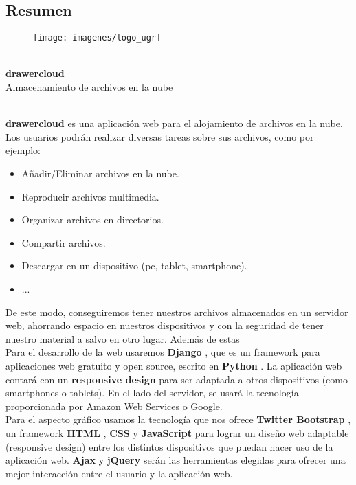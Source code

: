 \subsection{Resumen}
\hfill
\begin{figure}[h]
	\centering
	\texttt{[image: imagenes/logo\_ugr]}
\end{figure}
\hfill
\begin{center}
	\horrule{0.5pt} \\[0.4cm] %
	\huge \textbf{drawercloud} \\ %
	\Large Almacenamiento de archivos en la nube \\ %
	\horrule{2pt} \\[0.5cm] %
\end{center}

\hfill

\textbf{drawercloud} es una aplicación web para el alojamiento de archivos en la nube. Los usuarios podrán realizar diversas tareas sobre sus archivos, como por ejemplo: 
\begin{itemize}
	\item Añadir/Eliminar archivos en la nube.
	\item Reproducir archivos multimedia.
	\item Organizar archivos en directorios.
	\item Compartir archivos.
	\item Descargar en un dispositivo (pc, tablet, smartphone).
	\item ...
\end{itemize}
De este modo, conseguiremos tener nuestros archivos almacenados en un servidor web, ahorrando espacio en nuestros dispositivos y con la seguridad de tener nuestro material a salvo en otro lugar. Además de estas \\

Para el desarrollo de la web usaremos \textbf{Django} \cite{cita1}, que es un framework para aplicaciones web gratuito y open source, escrito en \textbf{Python} \cite{cita2}. La aplicación web contará con un \textbf{responsive design} para ser adaptada a otros dispositivos (como smartphones o tablets). En el lado del servidor, se usará la tecnología proporcionada por Amazon Web Services o Google.\\

Para el aspecto gráfico usamos la tecnología que nos ofrece \textbf{Twitter Bootstrap} \cite{cita3}, un framework \textbf{HTML} \cite{cita4}, \textbf{CSS} \cite{cita5} y \textbf{JavaScript} \cite{cita6} para lograr un diseño web adaptable (responsive design) entre los distintos dispositivos que puedan hacer uso de la aplicación web. \textbf{Ajax} \cite{cita7} y \textbf{jQuery} \cite{cita8} serán las herramientas elegidas para ofrecer una mejor interacción entre el usuario y la aplicación web. \\

